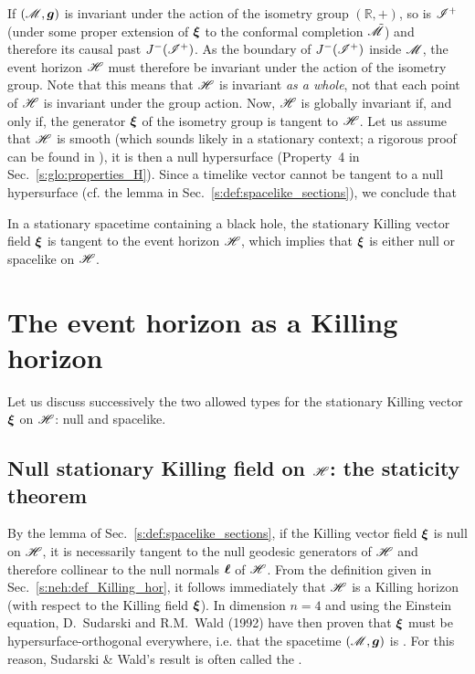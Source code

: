 If $(\mathscr{M},\bm{g})$ is invariant under the action of the isometry group $(\mathbb{R},+)$,
so is $\mathscr{I}^+$ (under some proper extension of $\bm{\xi}$ to the conformal
completion $\tilde{\mathscr{M}}$)
and therefore its causal past $J^-(\mathscr{I}^+)$. As the boundary of $J^-(\mathscr{I}^+)$
inside $\mathscr{M}$, the event horizon $\mathscr{H}$ must therefore be invariant under the
action of the isometry group.
Note that this means that $\mathscr{H}$ is invariant \emph{as a whole}, not that
each point of $\mathscr{H}$ is invariant under the group action.
Now, $\mathscr{H}$ is globally invariant if, and only if, the
generator $\bm{\xi}$ of the isometry group is tangent to $\mathscr{H}$.
Let us assume that $\mathscr{H}$ is smooth (which sounds likely in a stationary context;
a rigorous proof can be found in \cite{ChrusDGH01}),
it is then a null hypersurface (Property~4 in Sec.~\ref{s:glo:properties_H}).
Since a timelike vector cannot be tangent to a null hypersurface (cf. the
lemma in Sec.~\ref{s:def:spacelike_sections}), we conclude that
\begin{greybox}
In a stationary spacetime containing a black hole,
the stationary Killing vector field  $\bm{\xi}$ is tangent to the event horizon
$\mathscr{H}$, which implies that $\bm{\xi}$ is either null or spacelike on $\mathscr{H}$.
\end{greybox}

\section{The event horizon as a Killing horizon}

Let us discuss successively the two allowed types for the stationary
Killing vector $\bm{\xi}$ on $\mathscr{H}$: null and spacelike.

\subsection{Null stationary Killing field on $\mathscr{H}$: the staticity theorem}

By the lemma of Sec.~\ref{s:def:spacelike_sections}, if the Killing vector
field $\bm{\xi}$ is null on $\mathscr{H}$, it is necessarily tangent to the null geodesic generators
of $\mathscr{H}$ and therefore collinear to the null normals $\bm{\ell}$ of $\mathscr{H}$. From the definition
given in Sec.~\ref{s:neh:def_Killing_hor}, it follows immediately that
$\mathscr{H}$ is a Killing horizon (with respect to the Killing field $\bm{\xi}$).
In dimension $n=4$ and using the Einstein equation,
D.~Sudarski and R.M.~Wald (1992) \cite{SudarW92} have then proven that $\bm{\xi}$ must be
hypersurface-orthogonal everywhere, i.e. that the spacetime $(\mathscr{M},\bm{g})$ is . For this reason, Sudarski \& Wald's result is often
called the .

